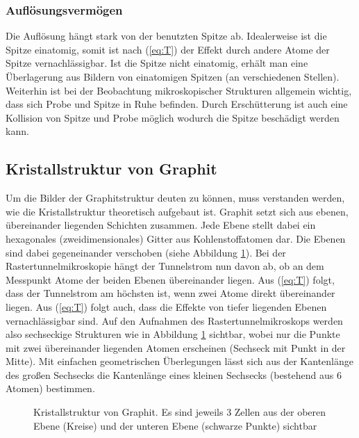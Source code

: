 \subsubsection{Auflösungsvermögen}
Die Auflösung hängt stark von der benutzten Spitze ab. Idealerweise ist die Spitze einatomig, somit ist nach (\ref{eq:T}) der Effekt durch andere Atome der Spitze vernachlässigbar. Ist die Spitze nicht einatomig, erhält man eine Überlagerung aus Bildern von einatomigen Spitzen (an verschiedenen Stellen). Weiterhin ist bei der Beobachtung mikroskopischer Strukturen allgemein wichtig, dass sich Probe und Spitze in Ruhe befinden. Durch Erschütterung ist auch eine Kollision von Spitze und Probe möglich wodurch die Spitze beschädigt werden kann.

\subsection{Kristallstruktur von Graphit}
Um die Bilder der Graphitstruktur deuten zu können, muss verstanden werden, wie die Kristallstruktur theoretisch aufgebaut ist. Graphit setzt sich aus ebenen, übereinander liegenden Schichten zusammen. Jede Ebene stellt dabei ein hexagonales (zweidimensionales) Gitter aus Kohlenstoffatomen dar. Die Ebenen sind dabei gegeneinander verschoben (siehe Abbildung \ref{fig:Graphit}). Bei der Rastertunnelmikroskopie hängt der Tunnelstrom nun davon ab, ob an dem Messpunkt Atome der beiden Ebenen übereinander liegen. Aus (\ref{eq:T}) folgt, dass der Tunnelstrom am höchsten ist, wenn zwei Atome direkt übereinander liegen. Aus (\ref{eq:T}) folgt auch, dass die Effekte von tiefer liegenden Ebenen vernachlässigbar sind. Auf den Aufnahmen des Rastertunnelmikroskops werden also sechseckige Strukturen wie in Abbildung \ref{fig:Graphit} sichtbar, wobei nur die Punkte mit zwei übereinander liegenden Atomen erscheinen (Sechseck mit Punkt in der Mitte). Mit einfachen geometrischen Überlegungen lässt sich aus der Kantenlänge des großen Sechsecks die Kantenlänge eines kleinen Sechsecks (bestehend aus 6 Atomen) bestimmen.   

\begin{figure}[h]
  \centering
  \caption{Kristallstruktur von Graphit. Es sind jeweils 3 Zellen aus der oberen Ebene (Kreise) und der unteren Ebene (schwarze Punkte) sichtbar}
  \label{fig:Graphit}
\end{figure}

             

